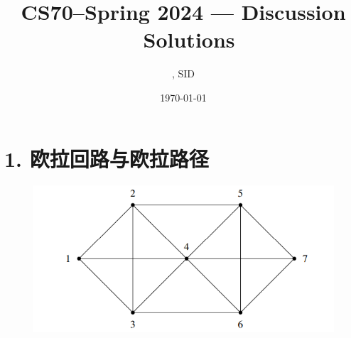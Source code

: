\documentclass[11pt]{article}
\title{CS70--Spring 2024 --- Discussion \Homework \ Solutions}
\author{\Name, SID \SID}
\date{\today}
\begin{document}
\maketitle


\section*{1. 欧拉回路与欧拉路径}
\begin{figure}
    \centering
    \includegraphics[width=0.5\linewidth]{week2/image.png}
\end{figure}
\end{document}
